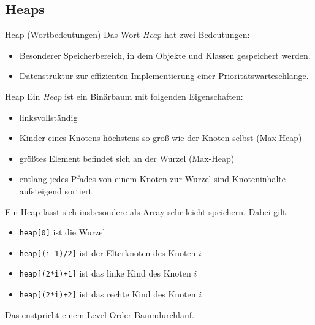 \subsection{Heaps}

\begin{bonus}{Heap (Wortbedeutungen)}
    Das Wort \emph{Heap} hat zwei Bedeutungen:
    \begin{itemize}
        \item Besonderer Speicherbereich, in dem Objekte und Klassen gespeichert werden.
        \item Datenstruktur zur effizienten Implementierung einer Prioritätswarteschlange.
    \end{itemize}
\end{bonus}

\begin{defi}{Heap}
    Ein \emph{Heap} ist ein Binärbaum mit folgenden Eigenschaften:
    \begin{itemize}
        \item linksvollständig
        \item Kinder eines Knotens höchstens so groß wie der Knoten selbst (Max-Heap)
        \item größtes Element befindet sich an der Wurzel (Max-Heap)
        \item entlang jedes Pfades von einem Knoten zur Wurzel sind Knoteninhalte aufsteigend sortiert
    \end{itemize}

    Ein Heap lässt sich insbesondere als Array sehr leicht speichern.
    Dabei gilt:
    \begin{itemize}
        \item \texttt{heap[0]} ist die Wurzel
        \item \texttt{heap[(i-1)/2]} ist der Elterknoten des Knoten $i$
        \item \texttt{heap[(2*i)+1]} ist das linke Kind des Knoten $i$
        \item \texttt{heap[(2*i)+2]} ist das rechte Kind des Knoten $i$
    \end{itemize}

    Das enstpricht einem Level-Order-Baumdurchlauf.
\end{defi}

